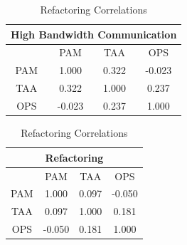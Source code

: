 \begin{table} [H]
 \RawFloats %
 \begin{minipage}{.45\textwidth}
  \caption{High Bandwidth Communication Correlations}
  \label{table:hbc_correlations}
  \begin{tabular}{| c | c | c | c |} \hline
  \multicolumn{4}{|c|}{\textbf{High Bandwidth Communication}}  \\ \hline
  & PAM & TAA & OPS \\ \hline
  PAM & 1.000 & 0.322 & -0.023 \\ \hline
  TAA & 0.322 & 1.000 & 0.237 \\ \hline
  OPS & -0.023 & 0.237 & 1.000 \\ \hline
 \end{tabular}
 \end{minipage}%
%
 \begin{minipage}{.45\textwidth}
  \centering
  \caption{Refactoring Correlations}
  \label{table:ref_correlations}
  \begin{tabular}{| c | c | c | c |} \hline
  \multicolumn{4}{|c|}{\textbf{Refactoring}}  \\ \hline
   & PAM & TAA & OPS \\ \hline
   PAM & 1.000 & 0.097 & -0.050 \\ \hline
   TAA & 0.097 & 1.000 & 0.181 \\ \hline
   OPS & -0.050 & 0.181 & 1.000 \\ \hline
  \end{tabular}  
 \end{minipage}%
\end{table}

